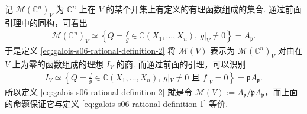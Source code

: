 记 $\mathcal M(\mathbb C^n)_V$ 为 $\mathbb C^n$ 上在 $V$ 的某个开集上有定义的有理函数组成的集合. 通过前面引理中的同构，可看出
\begin{align*}
\mathcal M(\mathbb C^n)_V\simeq
\left\{Q=\frac fg\in\mathbb C(X_1,\ldots,X_n),\ g|_V\ne0\right\}=A_{\mathfrak p}.
\end{align*}
于是定义 \eqref{eq:galois-s06-rational-definition-2} 将 $\mathcal M(V)$ 表示为 $\mathcal M(\mathbb C^n)_V$ 对由在 $V$ 上为零的函数组成的理想 $I_V$ 的商. 而通过前面的引理，可以识别
\begin{align*}
I_V\simeq\left\{Q=\frac fg\in\mathbb C(X_1,\ldots,X_n),\ g|_V\ne0\text{ 且 }f|_V=0\right\}=\mathfrak pA_{\mathfrak p}.
\end{align*}
所以定义 \eqref{eq:galois-s06-rational-definition-2} 就是令 $\mathcal M(V):=A_{\mathfrak p}/\mathfrak pA_{\mathfrak p}$，而上面的命题保证它与定义 \eqref{eq:galois-s06-rational-definition-1} 等价.


